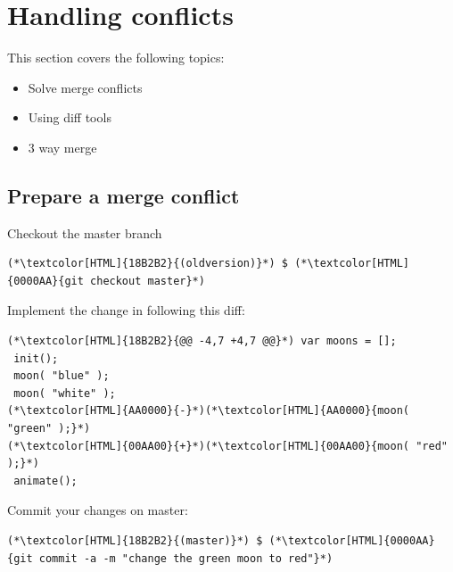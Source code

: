 \section{Handling conflicts}
\begin{frame}[fragile]
  \slidetitle
  This section covers the following topics:
  \begin{itemize}
    \item Solve merge conflicts
    \item Using diff tools
    \item 3 way merge
  \end{itemize}
\end{frame}

\subsection{Prepare a merge conflict}
\begin{frame}[fragile]
  \subslidetitle
  Checkout the master branch
  \begin{lstlisting}
(*\textcolor[HTML]{18B2B2}{(oldversion)}*) $ (*\textcolor[HTML]{0000AA}{git checkout master}*)
\end{lstlisting}
  Implement the change in  following this diff:
  \begin{lstlisting}
(*\textcolor[HTML]{18B2B2}{@@ -4,7 +4,7 @@}*) var moons = [];
 init();
 moon( "blue" );
 moon( "white" );
(*\textcolor[HTML]{AA0000}{-}*)(*\textcolor[HTML]{AA0000}{moon( "green" );}*)
(*\textcolor[HTML]{00AA00}{+}*)(*\textcolor[HTML]{00AA00}{moon( "red" );}*)
 animate();
\end{lstlisting}

  Commit your changes on master:
  \begin{lstlisting}
(*\textcolor[HTML]{18B2B2}{(master)}*) $ (*\textcolor[HTML]{0000AA}{git commit -a -m "change the green moon to red"}*)
\end{lstlisting}

\end{frame}

